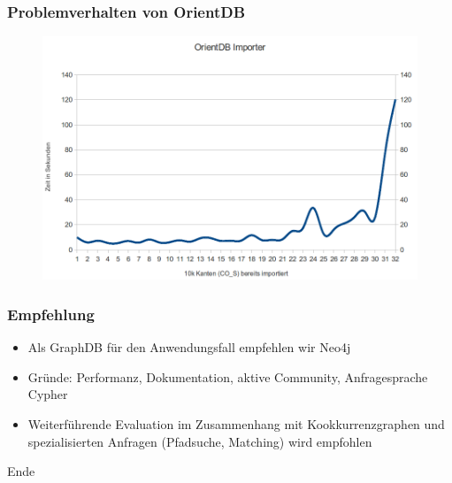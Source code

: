 \documentclass{beamer}
\begin{document}
\begin{frame}\frametitle{Problemverhalten von OrientDB}
\begin{figure}[ht]
\centering
\includegraphics[scale=0.28]{../report/pics/OrientImporter}
\label{fig:mysql_schema}
\end{figure}
\end{frame}

\begin{frame}\frametitle{Empfehlung}
	\begin{itemize}
		\item Als GraphDB für den Anwendungsfall empfehlen wir Neo4j
		\item Gründe: Performanz, Dokumentation, aktive Community, Anfragesprache Cypher
		\item Weiterführende Evaluation im Zusammenhang mit Kookkurrenzgraphen und spezialisierten Anfragen (Pfadsuche, Matching) wird empfohlen
	\end{itemize} 
\end{frame}

\begin{frame}
	\begin{center}
		\begin{Huge}
			Ende
		\end{Huge}
	\end{center}
\end{frame}
\end{document}
